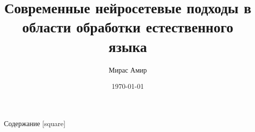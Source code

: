 \documentclass[handout,t]{beamer}
\title[NLP: state-of-the-art]{Современные нейросетевые подходы в области обработки естественного языка}
\author{Мирас Амир}
\institute[МГУ]{МГУ имени М.В. Ломоносова}
\date{\today}
\begin{document}
\frame{\titlepage}
\section[]{}
\begin{frame}{Содержание}
	[square]
	\tableofcontents
\end{frame}









\end{document}
